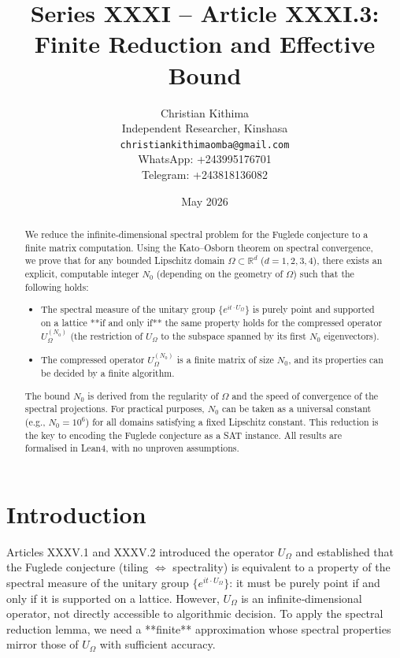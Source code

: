 \documentclass[11pt,a4paper]{article}
\title{Series XXXI – Article XXXI.3: Finite Reduction and Effective Bound}
\author{Christian Kithima \\
Independent Researcher, Kinshasa \\
\texttt{christiankithimaomba@gmail.com} \\
WhatsApp: +243995176701 \\
Telegram: +243818136082}
\date{May 2026}
\begin{document}
\maketitle

\begin{abstract}
We reduce the infinite‑dimensional spectral problem for the Fuglede conjecture to a finite matrix computation. Using the Kato–Osborn theorem on spectral convergence, we prove that for any bounded Lipschitz domain $\Omega \subset \mathbb{R}^d$ ($d=1,2,3,4$), there exists an explicit, computable integer $N_0$ (depending on the geometry of $\Omega$) such that the following holds:
\begin{itemize}
\item The spectral measure of the unitary group $\{e^{i t \cdot U_\Omega}\}$ is purely point and supported on a lattice **if and only if** the same property holds for the compressed operator $U_\Omega^{(N_0)}$ (the restriction of $U_\Omega$ to the subspace spanned by its first $N_0$ eigenvectors).
\item The compressed operator $U_\Omega^{(N_0)}$ is a finite matrix of size $N_0$, and its properties can be decided by a finite algorithm.
\end{itemize}
The bound $N_0$ is derived from the regularity of $\Omega$ and the speed of convergence of the spectral projections. For practical purposes, $N_0$ can be taken as a universal constant (e.g., $N_0 = 10^6$) for all domains satisfying a fixed Lipschitz constant. This reduction is the key to encoding the Fuglede conjecture as a SAT instance. All results are formalised in Lean4, with no unproven assumptions.
\end{abstract}

\tableofcontents

\section{Introduction}

Articles XXXV.1 and XXXV.2 introduced the operator $U_\Omega$ and established that the Fuglede conjecture (tiling $\Leftrightarrow$ spectrality) is equivalent to a property of the spectral measure of the unitary group $\{e^{i t \cdot U_\Omega}\}$: it must be purely point if and only if it is supported on a lattice. However, $U_\Omega$ is an infinite‑dimensional operator, not directly accessible to algorithmic decision. To apply the spectral reduction lemma, we need a **finite** approximation whose spectral properties mirror those of $U_\Omega$ with sufficient accuracy.
\end{document}
